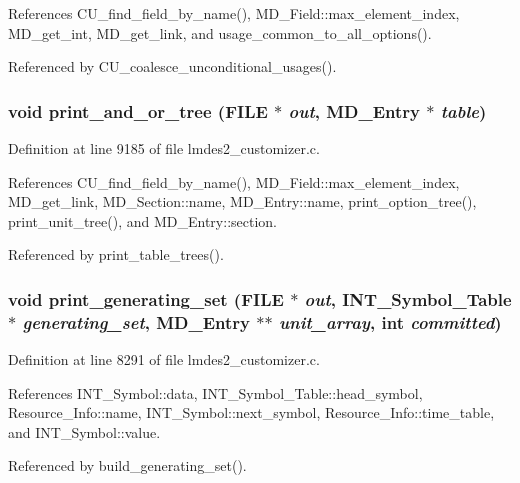 References CU\_\-find\_\-field\_\-by\_\-name(), MD\_\-Field::max\_\-element\_\-index, MD\_\-get\_\-int, MD\_\-get\_\-link, and usage\_\-common\_\-to\_\-all\_\-options().

Referenced by CU\_\-coalesce\_\-unconditional\_\-usages().
\subsubsection{\setlength{\rightskip}{0pt plus 5cm}void print\_\-and\_\-or\_\-tree (FILE $\ast$ {\em out}, \bf{MD\_\-Entry} $\ast$ {\em table})}\label{lmdes2__customizer_8c_b3fc3f2427e4193ddc11562a6ed56f7b}




Definition at line 9185 of file lmdes2\_\-customizer.c.

References CU\_\-find\_\-field\_\-by\_\-name(), MD\_\-Field::max\_\-element\_\-index, MD\_\-get\_\-link, MD\_\-Section::name, MD\_\-Entry::name, print\_\-option\_\-tree(), print\_\-unit\_\-tree(), and MD\_\-Entry::section.

Referenced by print\_\-table\_\-trees().
\subsubsection{\setlength{\rightskip}{0pt plus 5cm}void print\_\-generating\_\-set (FILE $\ast$ {\em out}, \bf{INT\_\-Symbol\_\-Table} $\ast$ {\em generating\_\-set}, \bf{MD\_\-Entry} $\ast$$\ast$ {\em unit\_\-array}, int {\em committed})}\label{lmdes2__customizer_8c_ebeba51fe729c503fd5b0918d2631671}




Definition at line 8291 of file lmdes2\_\-customizer.c.

References INT\_\-Symbol::data, INT\_\-Symbol\_\-Table::head\_\-symbol, Resource\_\-Info::name, INT\_\-Symbol::next\_\-symbol, Resource\_\-Info::time\_\-table, and INT\_\-Symbol::value.

Referenced by build\_\-generating\_\-set().
